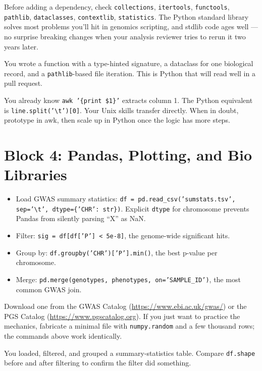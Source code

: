 \begin{tipbox}
Before adding a dependency, check \texttt{collections}, \texttt{itertools}, \texttt{functools}, \texttt{pathlib}, \texttt{dataclasses}, \texttt{contextlib}, \texttt{statistics}. The Python standard library solves most problems you'll hit in genomics scripting, and stdlib code ages well --- no surprise breaking changes when your analysis reviewer tries to rerun it two years later.
\end{tipbox}
\begin{winbox}[Checkpoint]
You wrote a function with a type-hinted signature, a dataclass for one biological record, and a \texttt{pathlib}-based file iteration. This is Python that will read well in a pull request.
\end{winbox}

\begin{tipbox}
You already know \texttt{awk '\{print \$1\}'} extracts column 1. The Python equivalent is \texttt{line.split('\textbackslash t')[0]}. Your Unix skills transfer directly. When in doubt, prototype in awk, then scale up in Python once the logic has more steps.
\end{tipbox}


\section{Block 4: Pandas, Plotting, and Bio Libraries}

\begin{itemize}[nosep]
  \item Load GWAS summary statistics: \texttt{df = pd.read\_csv('sumstats.tsv', sep='\textbackslash t', dtype=\{'CHR': str\})}. Explicit \texttt{dtype} for chromosome prevents Pandas from silently parsing ``X'' as NaN.
  \item Filter: \texttt{sig = df[df['P'] < 5e-8]}, the genome-wide significant hits.
  \item Group by: \texttt{df.groupby('CHR')['P'].min()}, the best p-value per chromosome.
  \item Merge: \texttt{pd.merge(genotypes, phenotypes, on='SAMPLE\_ID')}, the most common GWAS join.
\end{itemize}
\begin{tipbox}
Download one from the GWAS Catalog (\url{https://www.ebi.ac.uk/gwas/}) or the PGS Catalog (\url{https://www.pgscatalog.org}). If you just want to practice the mechanics, fabricate a minimal file with \texttt{numpy.random} and a few thousand rows; the commands above work identically.
\end{tipbox}
\begin{winbox}[Checkpoint]
You loaded, filtered, and grouped a summary-statistics table. Compare \texttt{df.shape} before and after filtering to confirm the filter did something.
\end{winbox}

